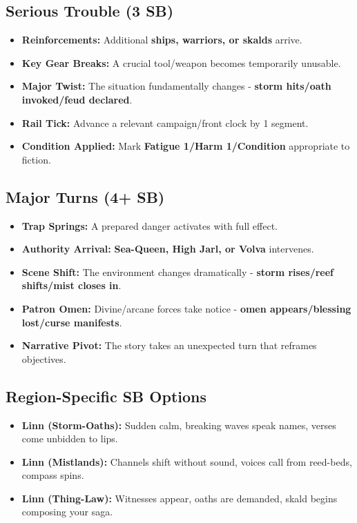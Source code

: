     \subsection*{Serious Trouble (3 SB)}
    \begin{itemize}
    \item \textbf{Reinforcements:} Additional \textbf{ships, warriors, or skalds} arrive.
    \item \textbf{Key Gear Breaks:} A crucial tool/weapon becomes temporarily unusable.
    \item \textbf{Major Twist:} The situation fundamentally changes - \textbf{storm hits/oath invoked/feud declared}.
    \item \textbf{Rail Tick:} Advance a relevant campaign/front clock by 1 segment.
    \item \textbf{Condition Applied:} Mark \textbf{Fatigue 1/Harm 1/Condition} appropriate to fiction.
    \end{itemize}
    
    \subsection*{Major Turns (4+ SB)}
    \begin{itemize}
    \item \textbf{Trap Springs:} A prepared danger activates with full effect.
    \item \textbf{Authority Arrival:} \textbf{Sea-Queen, High Jarl, or Volva} intervenes.
    \item \textbf{Scene Shift:} The environment changes dramatically - \textbf{storm rises/reef shifts/mist closes in}.
    \item \textbf{Patron Omen:} Divine/arcane forces take notice - \textbf{omen appears/blessing lost/curse manifests}.
    \item \textbf{Narrative Pivot:} The story takes an unexpected turn that reframes objectives.
    \end{itemize}
    
    \subsection*{Region-Specific SB Options}
    \begin{itemize}
    \item \textbf{Linn (Storm-Oaths):} Sudden calm, breaking waves speak names, verses come unbidden to lips.
    \item \textbf{Linn (Mistlands):} Channels shift without sound, voices call from reed-beds, compass spins.
    \item \textbf{Linn (Thing-Law):} Witnesses appear, oaths are demanded, skald begins composing your saga.
    \end{itemize}
    

